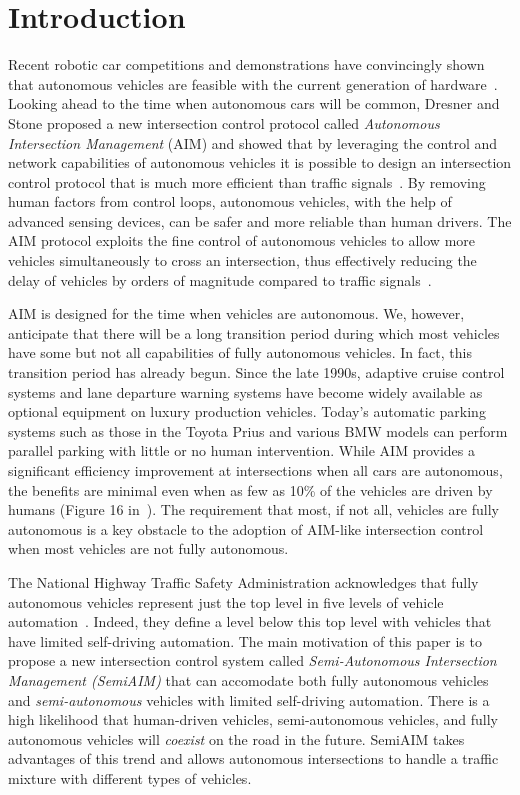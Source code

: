 \section{Introduction}
\label{sec:introduction}

Recent robotic car competitions and demonstrations have convincingly
shown that autonomous vehicles are feasible with the current
generation of hardware~\cite{mybib:Darpa07Urban}. Looking ahead to the
time when autonomous cars will be common, Dresner and Stone proposed a
new intersection control protocol called \emph{Autonomous Intersection
Management} (AIM) and showed that by leveraging the control and
network capabilities of autonomous vehicles it is possible to design
an intersection control protocol that is much more efficient than
traffic signals~\cite{bib:Dresner08Multiagent}.  By removing human
factors from control loops, autonomous vehicles, with the help of
advanced sensing devices, can be safer and more reliable than human
drivers.  The AIM protocol exploits the fine control of autonomous
vehicles to allow more vehicles simultaneously to cross an
intersection, thus effectively reducing the delay of vehicles by
orders of magnitude compared to traffic
signals~\cite{bib:Fajardo12Automated}.

AIM is designed for the time when vehicles are autonomous.  We,
however, anticipate that there will be a long transition period during
which most vehicles have some but not all capabilities of fully
autonomous vehicles.  In fact, this transition period has already
begun. Since the late 1990s, adaptive cruise control systems and lane
departure warning systems have become widely available as optional
equipment on luxury production vehicles.  Today's automatic parking
systems such as those in the Toyota Prius and various BMW models can
perform parallel parking with little or no human intervention.  While
AIM provides a significant efficiency improvement at intersections
when all cars are autonomous, the benefits are minimal even when as
few as 10\% of the vehicles are driven by humans (Figure 16
in~\cite{bib:Dresner08Multiagent}).  The requirement that most,
if not all,
vehicles are fully autonomous is a key obstacle to the adoption
of AIM-like intersection control when most vehicles are not fully autonomous.

The National Highway Traffic Safety Administration acknowledges that
fully autonomous vehicles represent just the top level in five levels
of vehicle automation~\cite{bib:NHTSA13Preliminary}. Indeed, they
define a level below this top level with vehicles that
have limited self-driving automation.
The main motivation of this paper is to
propose a new intersection control system called
\emph{Semi-Autonomous Intersection Management (SemiAIM)} that can
accomodate both fully autonomous vehicles and
\emph{semi-autonomous} vehicles with limited self-driving automation.
There is a high likelihood that
human-driven vehicles, semi-autonomous vehicles, and fully autonomous
vehicles will \emph{coexist} on the road in the future.  SemiAIM takes
advantages of this trend and allows autonomous intersections to handle
a traffic mixture with different types of vehicles.

